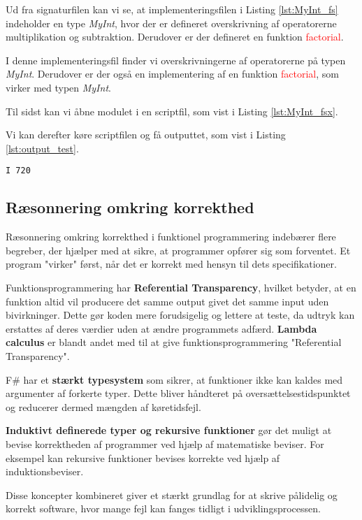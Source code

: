 Ud fra signaturfilen kan vi se, at implementeringsfilen i Listing \ref{lst:MyInt_fs} indeholder en type \textit{MyInt}, hvor der er defineret overskrivning af operatorerne multiplikation og subtraktion. Derudover er der defineret en funktion \textcolor{red}{factorial}. 



I denne implementeringsfil finder vi overskrivningerne af operatorerne på typen \textit{MyInt}. Derudover er der også en implementering af en funktion \textcolor{red}{factorial}, som virker med typen \textit{MyInt}. 

Til sidst kan vi åbne modulet i en scriptfil, som vist i Listing \ref{lst:MyInt_fsx}.



Vi kan derefter køre scriptfilen og få outputtet, som vist i Listing \ref{lst:output_test}.

\begin{lstlisting}[style=output, label={lst:output_test}, caption={Output ved kørsel af \textit{MyInt.fsx}}]
I 720
\end{lstlisting}

\subsection{Ræsonnering omkring korrekthed}
Ræsonnering omkring korrekthed i funktionel programmering indebærer flere begreber, der hjælper med at sikre, at programmer opfører sig som forventet. Et program "virker" først, når det er korrekt med hensyn til dets specifikationer.

Funktionsprogrammering har \textbf{Referential Transparency}, hvilket betyder, at en funktion altid vil producere det samme output givet det samme input uden bivirkninger. Dette gør koden mere forudsigelig og lettere at teste, da udtryk kan erstattes af deres værdier uden at ændre programmets adfærd. \textbf{Lambda calculus} er blandt andet med til at give funktionsprogrammering "Referential Transparency".

F\# har et \textbf{stærkt typesystem} som sikrer, at funktioner ikke kan kaldes med argumenter af forkerte typer. Dette bliver håndteret på oversættelsestidspunktet og reducerer dermed mængden af køretidsfejl.

\textbf{Induktivt definerede typer og rekursive funktioner} gør det muligt at bevise korrektheden af programmer ved hjælp af matematiske beviser. For eksempel kan rekursive funktioner bevises korrekte ved hjælp af induktionsbeviser.

Disse koncepter kombineret giver et stærkt grundlag for at skrive pålidelig og korrekt software, hvor mange fejl kan fanges tidligt i udviklingsprocessen.



